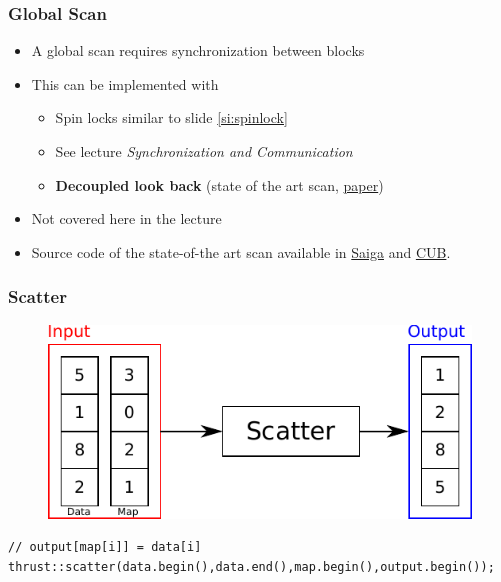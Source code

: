 \documentclass[aspectratio=169,handout]{beamer}
\begin{document}
\begin{frame}[fragile]
\frametitle{Global Scan}
\begin{itemize}
	\item A global scan requires synchronization between blocks
	\item<2-> This can be implemented with
	\begin{itemize}
		\item<2-> Spin locks similar to slide \ref{si:spinlock}
		\item<2->[$\rightarrow$] See lecture \textit{Synchronization and Communication}
		\item<3-> \textbf{Decoupled look back} (state of the art scan, \href{https://research.nvidia.com/sites/default/files/pubs/2016-03_Single-pass-Parallel-Prefix/nvr-2016-002.pdf}{paper})
	\end{itemize} 
	\item<3-> Not covered here in the lecture
	\item<4-> Source code of the state-of-the art scan available in \href{https://github.com/darglein/saiga/blob/master/src/saiga/cuda/scan.h}{Saiga} and \href{https://nvlabs.github.io/cub/structcub_1_1_device_scan.html}{CUB}.
\end{itemize}
\end{frame}

\begin{frame}[fragile]
\frametitle{Scatter}
\begin{figure}
	\centering
	\includegraphics[height=0.6\textheight]{o_scatter}
\end{figure}

\begin{lstlisting}
// output[map[i]] = data[i]
thrust::scatter(data.begin(),data.end(),map.begin(),output.begin());
\end{lstlisting}
\end{frame}
\end{document}
